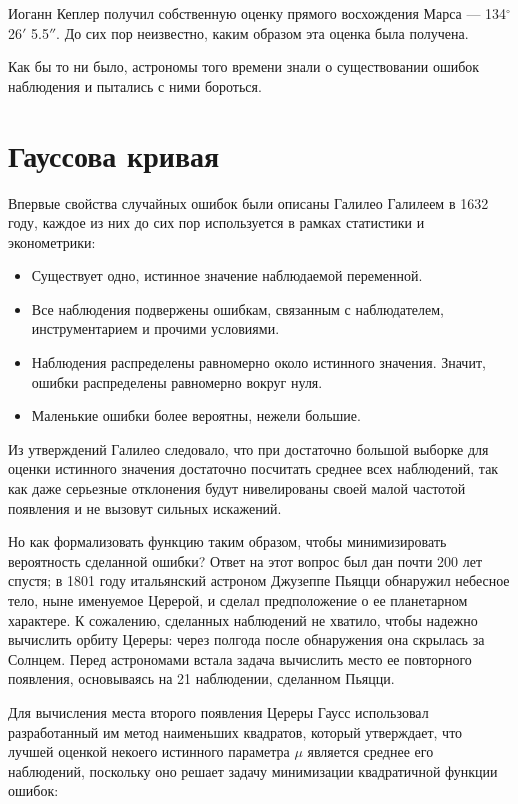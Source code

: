 \documentclass[a4paper,12pt]{article}
\begin{document}
	
	Иоганн Кеплер получил собственную оценку прямого восхождения Марса — 134$^\circ$ 26$'$ 5.5$''$. До сих пор неизвестно, каким образом эта оценка была получена. 
	
	Как бы то ни было, астрономы того времени знали о существовании ошибок наблюдения и пытались с ними бороться.
	
	\section*{Гауссова кривая}
	Впервые свойства случайных ошибок были описаны Галилео Галилеем в 1632 году, каждое из них  до сих пор используется в рамках статистики и эконометрики:
	\begin{itemize}
		\item  Существует одно, истинное значение наблюдаемой переменной.
		\item  Все наблюдения подвержены ошибкам, связанным с наблюдателем, инструментарием и прочими условиями.
		\item  Наблюдения распределены равномерно около истинного значения. Значит, ошибки распределены равномерно вокруг нуля.
		\item  Маленькие ошибки более вероятны, нежели большие.
	\end{itemize}
	
	Из утверждений Галилео следовало, что при достаточно большой выборке для оценки истинного значения достаточно посчитать среднее всех наблюдений, так как даже серьезные отклонения будут нивелированы своей малой частотой появления и не вызовут сильных искажений.
	
	Но как формализовать функцию таким образом, чтобы минимизировать вероятность сделанной ошибки? Ответ на этот вопрос был дан почти 200 лет спустя; в 1801 году итальянский астроном Джузеппе Пьяцци обнаружил небесное тело, ныне именуемое Церерой, и сделал предположение о ее планетарном характере. К сожалению, сделанных наблюдений не хватило, чтобы надежно вычислить орбиту Цереры: через полгода после обнаружения она скрылась за Солнцем. Перед астрономами встала задача вычислить место ее повторного появления, основываясь на 21 наблюдении, сделанном Пьяцци.
	
	Для вычисления места второго появления Цереры Гаусс использовал разработанный им метод наименьших квадратов, который утверждает, что лучшей оценкой некоего истинного параметра $\mu$ является среднее его наблюдений, поскольку  оно решает задачу минимизации квадратичной функции ошибок:
	
\end{document}
